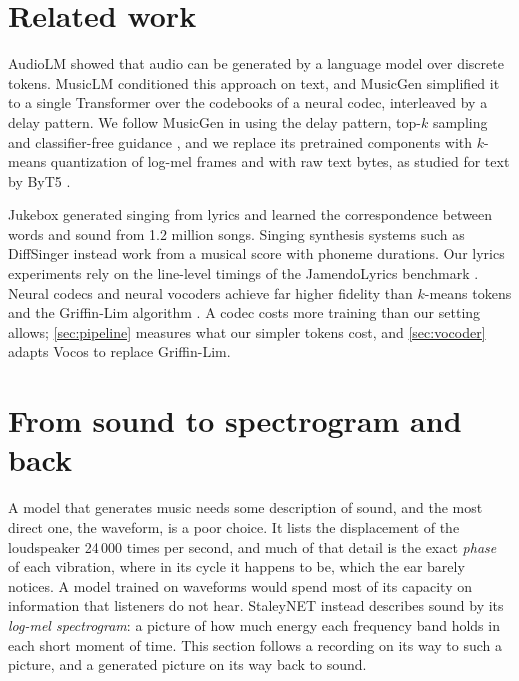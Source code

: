 \section{Related work}
\label{sec:related}

AudioLM \cite{borsos2023audiolm} showed that audio can be generated by a
language model over discrete tokens. MusicLM \cite{agostinelli2023musiclm}
conditioned this approach on text, and MusicGen \cite{copet2023musicgen}
simplified it to a single Transformer over the codebooks of a neural codec,
interleaved by a delay pattern. We follow MusicGen in using the delay
pattern, top-$k$ sampling \cite{fan2018hierarchical} and classifier-free
guidance \cite{ho2022cfg}, and we replace its pretrained components with
$k$-means quantization of log-mel frames and with raw text bytes, as studied
for text by ByT5 \cite{xue2022byt5}.

Jukebox \cite{dhariwal2020jukebox} generated singing from lyrics and learned
the correspondence between words and sound from 1.2 million songs. Singing
synthesis systems such as DiffSinger \cite{liu2022diffsinger} instead work from
a musical score with phoneme durations. Our lyrics experiments rely on the
line-level timings of the JamendoLyrics benchmark
\cite{stoller2019lyrics,durand2023lyrics}. Neural codecs
\cite{zeghidour2021soundstream,defossez2023encodec,kumar2023dac} and neural
vocoders \cite{kong2020hifigan,siuzdak2023vocos} achieve far higher fidelity
than $k$-means tokens and the Griffin-Lim algorithm
\cite{griffin1984signal,perraudin2013fast}. A codec costs more training than our
setting allows; \cref{sec:pipeline} measures what our simpler tokens cost, and
\cref{sec:vocoder} adapts Vocos to replace Griffin-Lim.

\section{From sound to spectrogram and back}
\label{sec:representation}

A model that generates music needs some description of sound, and the most
direct one, the waveform, is a poor choice. It lists the displacement of the
loudspeaker 24\,000 times per second, and much of that detail is the exact
\emph{phase} of each vibration, where in its cycle it happens to be, which the
ear barely notices. A model trained on waveforms would spend most of its
capacity on information that listeners do not hear. StaleyNET instead
describes sound by its \emph{log-mel spectrogram}: a picture of how much energy
each frequency band holds in each short moment of time. This section follows a
recording on its way to such a picture, and a generated picture on its way
back to sound.

